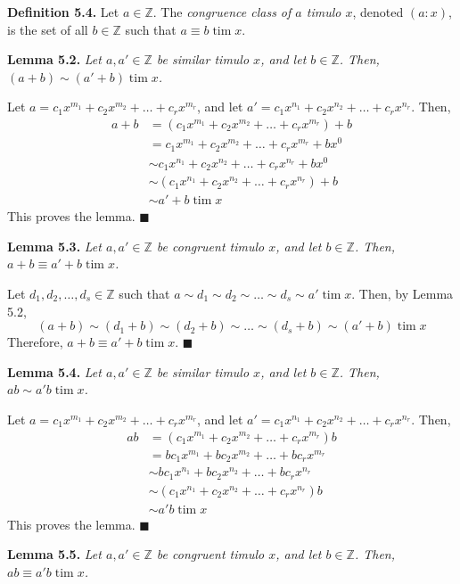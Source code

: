 \documentclass{article}
\newcommand{\tim}{\;\text{tim}\;}
\newcommand{\zee}{\mathbb{Z}}
\begin{document}
\textbf{Definition 5.4.} Let $a \in \zee$. The
\textit{congruence class of $a$ timulo $x$},
denoted $(a:x)$, is the set of all $b \in \zee$
such that $a \equiv b \tim x$.

\textbf{Lemma 5.2.} \textit{Let $a, a' \in \zee$ be
similar timulo $x$, and let $b \in \zee$. Then,
$(a + b) \sim (a' + b) \tim x$.}

Let $a = c_1x^{m_1} + c_2x^{m_2} + \ldots + c_rx^{m_r}$,
and let
$a' = c_1x^{n_1} + c_2x^{n_2} + \ldots + c_rx^{n_r}$.
Then,
\[\begin{split}
    a + b &= (c_1x^{m_1} + c_2x^{m_2} + \ldots + c_rx^{m_r}) + b \\
    &= c_1x^{m_1} + c_2x^{m_2} + \ldots + c_rx^{m_r} + bx^0 \\
    &\sim c_1x^{n_1} + c_2x^{n_2} + \ldots + c_rx^{n_r} + bx^0 \\
    &\sim (c_1x^{n_1} + c_2x^{n_2} + \ldots + c_rx^{n_r}) + b \\
    &\sim a' + b \tim x
\end{split}\]
This proves the lemma. $\blacksquare$

\newpage
\textbf{Lemma 5.3.} \textit{Let $a, a' \in \zee$ be
congruent timulo $x$, and let $b \in \zee$. Then,
$a + b \equiv a' + b \tim x$.}

Let $d_1, d_2, \ldots, d_s \in \zee$
such that $a \sim d_1 \sim d_2 \sim \ldots \sim d_s \sim a' \tim x$.
Then, by Lemma 5.2,
\[(a + b) \sim (d_1 + b) \sim (d_2 + b) \sim \ldots
\sim (d_s + b) \sim (a' + b) \tim x\]
Therefore, $a + b \equiv a' + b \tim x$.
$\blacksquare$

\textbf{Lemma 5.4.} \textit{Let $a, a' \in \zee$ be
similar timulo $x$, and let $b \in \zee$. Then,
$ab \sim a'b \tim x$.}

Let $a = c_1x^{m_1} + c_2x^{m_2} + \ldots + c_rx^{m_r}$,
and let
$a' = c_1x^{n_1} + c_2x^{n_2} + \ldots + c_rx^{n_r}$.
Then,
\[\begin{split}
    ab &= (c_1x^{m_1} + c_2x^{m_2} + \ldots + c_rx^{m_r})b \\
    &= bc_1x^{m_1} + bc_2x^{m_2} + \ldots + bc_rx^{m_r} \\
    &\sim bc_1x^{n_1} + bc_2x^{n_2} + \ldots + bc_rx^{n_r} \\
    &\sim (c_1x^{n_1} + c_2x^{n_2} + \ldots + c_rx^{n_r})b \\
    &\sim a'b \tim x
\end{split}\]
This proves the lemma. $\blacksquare$

\textbf{Lemma 5.5.} \textit{Let $a, a' \in \zee$ be
congruent timulo $x$, and let $b \in \zee$. Then,
$ab \equiv a'b \tim x$.}
\end{document}
